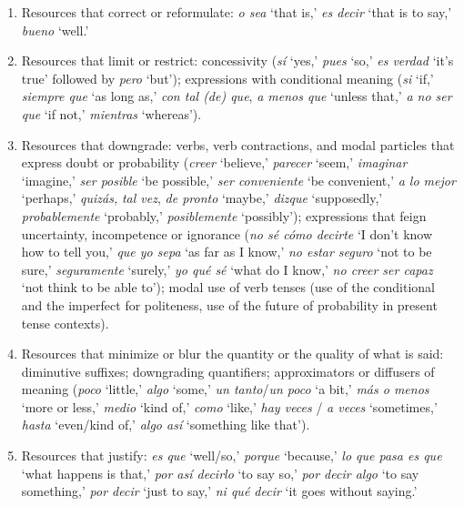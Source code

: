 \documentclass[output=paper]{langscibook}
\begin{document}
\begin{enumerate}
   
     \item Resources that correct or reformulate: \textit{o sea} ‘that is,’ \textit{es decir} ‘that is to say,’ \textit{bueno} ‘well.’ 

 
     \item Resources that limit or restrict: concessivity (\textit{sí} ‘yes,’ \textit{pues} ‘so,’ \textit{es verdad} ‘it’s true’ followed by \textit{pero} ‘but'); expressions with conditional meaning (\textit{si} ‘if,’ \textit{siempre que}  ‘as long as,’ \textit{con tal (de) que}, \textit{a menos que}  ‘unless that,’ \textit{a no ser que} ‘if not,’ \textit{mientras} ‘whereas’). 

 
     \item Resources that downgrade: verbs, verb contractions, and modal particles that express doubt or probability (\textit{creer}  ‘believe,’ \textit{parecer} ‘seem,’ \textit{imaginar}  ‘imagine,’ \textit{ser posible} ‘be possible,’ \textit{ser conveniente}  ‘be convenient,’ \textit{a lo mejor}  ‘perhaps,’ \textit{quizás,} \textit{tal vez}, \textit{de pronto} ‘maybe,’ \textit{dizque} ‘supposedly,’ \textit{probablemente} ‘probably,’ \textit{posiblemente} ‘possibly’); expressions that feign uncertainty, incompetence or ignorance (\textit{no sé cómo decirte}  ‘I don’t know how to tell you,’ \textit{que yo sepa} ‘as far as I know,’ \textit{no estar seguro} ‘not to be sure,’ \textit{seguramente} ‘surely,’ \textit{yo qué sé}  ‘what do I know,’ \textit{no creer ser capaz} ‘not think to be able to’); modal use of verb tenses (use of the conditional and the imperfect for politeness, use of the future of probability in present tense contexts).  

 
     \item Resources that minimize or blur the quantity or the quality of what is said: diminutive suffixes; downgrading quantifiers; approximators or diffusers of meaning (\textit{poco} ‘little,’ \textit{algo} ‘some,’ \textit{un tanto}/\textit{un poco} ‘a bit,’ \textit{más o menos} ‘more or less,’ \textit{medio} ‘kind of,’ \textit{como} ‘like,’ \textit{hay veces} / \textit{a veces} ‘sometimes,’ \textit{hasta} ‘even/kind of,’ \textit{algo así} ‘something like that’).  

 
     \item Resources that justify: \textit{es que} ‘well/so,’ \textit{porque} ‘because,’ \textit{lo que pasa es que} ‘what happens is that,’ \textit{por así decirlo} ‘to say so,’ \textit{por decir algo} ‘to say something,’ \textit{por decir} ‘just to say,’ \textit{ni qué decir} ‘it goes without saying.’ 


\end{enumerate}
\end{document}
